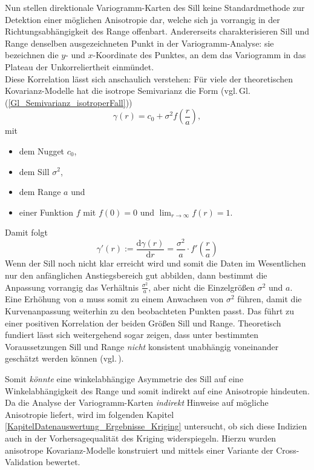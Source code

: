 Nun stellen direktionale Variogramm-Karten des Sill 
keine Standardmethode zur 
Detektion einer möglichen Anisotropie dar,
welche sich ja vorrangig in der Richtungsabhängigkeit des
Range offenbart. Andererseits charakterisieren Sill und
Range denselben 
ausgezeichneten Punkt in der Variogramm-Analyse: 
sie bezeichnen die $y$- und $x$-Koordinate des Punktes,
an dem das Variogramm in das Plateau der Unkorreliertheit 
einmündet.\\ 
Diese Korrelation lässt sich 
anschaulich verstehen: 
Für viele der theoretischen Kovarianz-Modelle hat die
isotrope Semivarianz die Form (vgl.\,Gl.\,(\ref{Gl_Semivarianz_isotroperFall}))
\begin{equation}
\gamma(r) = c_0 + \sigma^2 f\left( \frac{r}{a}\right),
\end{equation} mit
\begin{itemize}[topsep=2pt,parsep=1pt,itemsep=0.5pt]
\item[$\circ$] dem Nugget $c_0$,
\item[$\circ$] dem Sill $\sigma^2$,
\item[$\circ$] dem Range $a$ und
\item[$\circ$] einer Funktion $f$ mit $f(0) = 0$ und 
$\displaystyle \lim_{r \longrightarrow \infty} f(r)=1$.
\end{itemize}
Damit folgt
\begin{equation}
\gamma'(r) := \frac{\mathrm{d}\gamma(r)}{\mathrm{d}r}=
\frac{\sigma^2}{a}\cdot f'\left( \frac{r}{a} \right)
\end{equation}
Wenn der Sill noch nicht klar erreicht wird und somit die Daten im Wesentlichen nur den 
anfänglichen Anstiegsbereich gut abbilden, dann bestimmt die Anpassung vorrangig 
das Verhältnis $\frac{\sigma^2}{a}$, aber nicht die Einzelgrößen $\sigma^2$ und $a$. 
Eine Erhöhung von $a$ muss somit zu einem Anwachsen von $\sigma^2$ führen, damit die 
Kurvenanpassung weiterhin zu den beobachteten Punkten passt. 
Das führt zu einer positiven Korrelation der beiden Größen Sill und Range. 
Theoretisch fundiert lässt sich weitergehend sogar zeigen, dass unter bestimmten 
Voraussetzungen Sill und Range \textit{nicht} konsistent unabhängig voneinander geschätzt werden 
können (vgl.\,\cite{Zhang2004}). 


Somit \textit{könnte} eine winkelabhängige Asymmetrie des Sill 
auf eine Winkelabhängigkeit des Range und somit indirekt auf eine 
Anisotropie hindeuten. \\

Da die Analyse der Variogramm-Karten \textit{indirekt} Hinweise auf mögliche 
Anisotropie liefert, wird im folgenden 
Kapitel \ref{KapitelDatenauswertung_Ergebnisse_Kriging} untersucht, 
ob sich diese Indizien auch in der Vorhersagequalität des Kriging 
widerspiegeln. Hierzu wurden anisotrope Kovarianz-Modelle konstruiert 
und mittels einer Variante der Cross-Validation bewertet.




 
